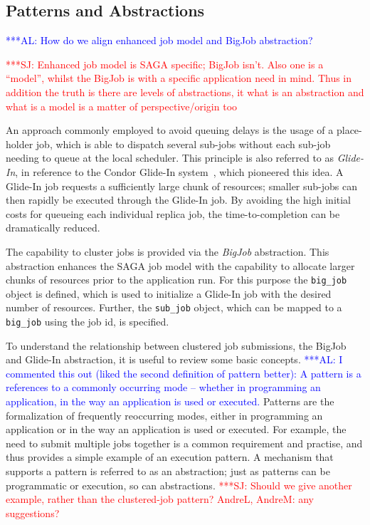 \documentclass{rspublic}
\newcommand{\alnote}[1]{ {\textcolor{blue} { ***AL: #1 }}}
\newcommand{\jhanote}[1]{ {\textcolor{red} { ***SJ: #1 }}}
\newcommand{\alnote}[1]{}
\newcommand{\jhanote}[1]{}
\begin{document}
               
\subsection{Patterns and Abstractions}
\alnote{How do we align enhanced job model and BigJob abstraction?}

\jhanote{Enhanced job model is SAGA specific; BigJob isn't. Also one
  is a ``model'', whilst the BigJob is with a specific application
  need in mind. Thus in addition the truth is there are levels of
  abstractions, it what is an abstraction and what is a model is a
  matter of perspective/origin too}              

An approach commonly employed to avoid queuing delays is the usage of
a place-holder job, which is able to dispatch several sub-jobs without
each sub-job needing to queue at the local scheduler. This principle
is also referred to as \emph{Glide-In}, in reference to the Condor
Glide-In system~\citep{citeulike:291860}, which pioneered this idea. A
Glide-In job requests a sufficiently large chunk of resources; smaller
sub-jobs can then rapidly be executed through the Glide-In job.  By
avoiding the high initial costs for queueing each individual replica
job, the time-to-completion can be dramatically reduced.

The capability to cluster jobs is provided via the \emph{BigJob}
abstraction. This abstraction enhances the SAGA job model with the
capability to allocate larger chunks of resources prior to the
application run. For this purpose the \texttt{big\_job} object is
defined, which is used to initialize a Glide-In job with the desired
number of resources.  Further, the \texttt{sub\_job} object, which can
be mapped to a \texttt{big\_job} using the job id, is specified.

To understand the relationship between clustered job submissions, the
BigJob and Gli\-de-In abstraction, it is useful to review some basic
concepts.  \alnote{I commented this out (liked the second definition
  of pattern better): A pattern is a references to a commonly
  occurring mode -- whether in programming an application, in the way
  an application is used or executed.}  Patterns are the formalization
of frequently reoccurring modes, either in programming an
application or in the way an application is used or executed.
For example, the need to submit multiple jobs together is a common
requirement and practise, and thus provides a simple example of an
execution pattern.  A mechanism that supports a pattern is referred to
as an abstraction; just as patterns can be programmatic or execution,
so can abstractions. \jhanote{Should we give another example, rather
  than the clustered-job pattern? AndreL, AndreM: any suggestions?}
\end{document}
